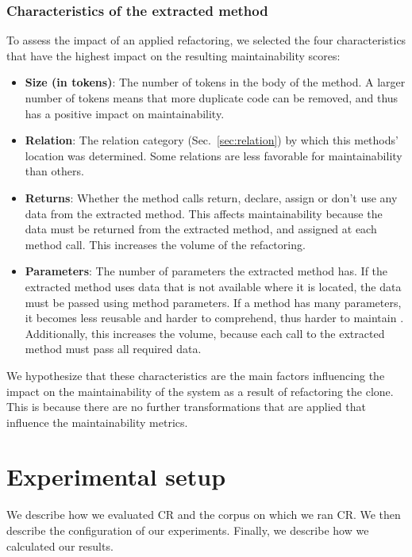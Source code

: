 \documentclass[a4paper,UKenglish,cleveref, autoref, thm-restate,authorcolumns]{lipics-v2019}
\begin{document}
\subsubsection{Characteristics of the extracted method}\label{sec:characteristics}
To assess the impact of an applied refactoring, we selected the four characteristics that have the highest impact on the resulting maintainability scores:
\begin{itemize}
\item \textbf{Size (in tokens)}: The number of tokens in the body of the method. A larger number of tokens means that more duplicate code can be removed, and thus has a positive impact on maintainability.
\item \textbf{Relation}: The relation category (Sec.~\ref{sec:relation}) by which this methods' location was determined. Some relations are less favorable for maintainability than others.
\item \textbf{Returns}: Whether the method calls return, declare, assign or don't use any data from the extracted method. This affects maintainability because the data must be returned from the extracted method, and assigned at each method call. This increases the volume of the refactoring.
\item \textbf{Parameters}: The number of parameters the extracted method has. If the extracted method uses data that is not available where it is located, the data must be passed using method parameters. If a method has many parameters, it becomes less reusable and harder to comprehend, thus harder to maintain \cite{heitlager2007practical}. Additionally, this increases the volume, because each call to the extracted method must pass all required data.
\end{itemize}
We hypothesize that these characteristics are the main factors influencing the impact on the maintainability of the system as a result of refactoring the clone. This is because there are no further transformations that are applied that influence the maintainability metrics.



\section{Experimental setup} \label{sec:experimentalsetup}
We describe how we evaluated CR and the corpus on which we ran CR. We then describe the configuration of our experiments. Finally, we describe how we calculated our results.
\end{document}
